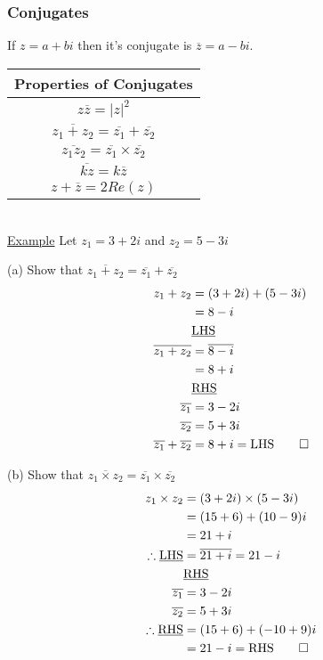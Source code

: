 \documentclass[a4paper]{article}
\begin{document}
			\subsubsection{Conjugates}
				If $z=a+bi$ then it's conjugate is $\overline{z}=a-bi$. \newline
				\begin{table}[H]
					\centering
					\bgroup
					\def\arraystretch{1.5}
					\begin{tabular}{|c|}
						\hline
						\textbf{Properties of Conjugates} \\
						\hline
						$z\overline{z}=|z|^2$ \\
						\hline
						$\overline{z_1+z_2}=\overline{z_1}+\overline{z_2}$ \\
						\hline
						$\overline{z_1z_2}=\overline{z_1}\times\overline{z_2}$ \\
						\hline
						$\overline{kz}=k\overline{z}$ \\
						\hline
						$z+\overline{z}=2Re(z)$ \\
						\hline
					\end{tabular}
					\egroup
				\end{table}\mbox{}\\
				\underline{Example}\newline
				Let $z_1=3+2i$ and $z_2=5-3i$ \newline\newline
				\begin{minipage}[t]{0.4\textwidth}
					(a) Show that $\overline{z_1+z_2}=\overline{z_1}+\overline{z_2}$
					\begin{align*}
						z_1+z_2&=(3+2i)+(5-3i)\\
						&=8-i \\
						&\text{\underline{LHS}}\\
						\overline{z_1+z_2}&=\overline{8-i} \\
						&=8+i \\
						&\text{\underline{RHS}}\\
						\overline{z_1}&=3-2i \\
						\overline{z_2}&=5+3i \\
						\overline{z_1}+\overline{z_2}&=8+i=\text{LHS}\qed
					\end{align*}
				\end{minipage}
				\hfill
				\begin{minipage}[t]{0.4\textwidth}
					(b) Show that $\overline{z_1\times z_2}=\overline{z_1}\times\overline{z_2}$
					\begin{align*}
						z_1\times z_2&=(3+2i)\times(5-3i) \\
						&=(15+6)+(10-9)i\\
						&=21+i\\
						\therefore\text{\underline{LHS}}&=\overline{21+i}=21-i \\
						&\text{\underline{RHS}} \\
						\overline{z_1}&=3-2i \\
						\overline{z_2}&=5+3i \\
						\therefore\text{\underline{RHS}}&=(15+6)+(-10+9)i \\
						&=21-i=\text{RHS}\qed
					\end{align*}
				\end{minipage}
\end{document}
